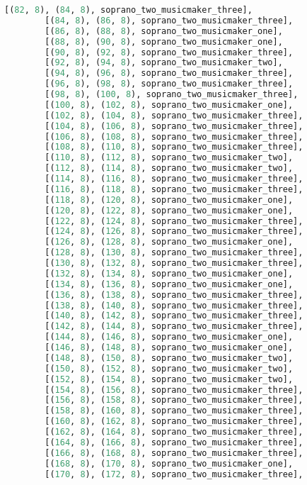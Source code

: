 \begin{lstlisting}[language=Python, caption=Invocation Source Code]
        [(82, 8), (84, 8), soprano_two_musicmaker_three],
        [(84, 8), (86, 8), soprano_two_musicmaker_three],
        [(86, 8), (88, 8), soprano_two_musicmaker_one],
        [(88, 8), (90, 8), soprano_two_musicmaker_one],
        [(90, 8), (92, 8), soprano_two_musicmaker_three],
        [(92, 8), (94, 8), soprano_two_musicmaker_two],
        [(94, 8), (96, 8), soprano_two_musicmaker_three],
        [(96, 8), (98, 8), soprano_two_musicmaker_three],
        [(98, 8), (100, 8), soprano_two_musicmaker_three],
        [(100, 8), (102, 8), soprano_two_musicmaker_one],
        [(102, 8), (104, 8), soprano_two_musicmaker_three],
        [(104, 8), (106, 8), soprano_two_musicmaker_three],
        [(106, 8), (108, 8), soprano_two_musicmaker_three],
        [(108, 8), (110, 8), soprano_two_musicmaker_three],
        [(110, 8), (112, 8), soprano_two_musicmaker_two],
        [(112, 8), (114, 8), soprano_two_musicmaker_two],
        [(114, 8), (116, 8), soprano_two_musicmaker_three],
        [(116, 8), (118, 8), soprano_two_musicmaker_three],
        [(118, 8), (120, 8), soprano_two_musicmaker_one],
        [(120, 8), (122, 8), soprano_two_musicmaker_one],
        [(122, 8), (124, 8), soprano_two_musicmaker_three],
        [(124, 8), (126, 8), soprano_two_musicmaker_three],
        [(126, 8), (128, 8), soprano_two_musicmaker_one],
        [(128, 8), (130, 8), soprano_two_musicmaker_three],
        [(130, 8), (132, 8), soprano_two_musicmaker_three],
        [(132, 8), (134, 8), soprano_two_musicmaker_one],
        [(134, 8), (136, 8), soprano_two_musicmaker_one],
        [(136, 8), (138, 8), soprano_two_musicmaker_three],
        [(138, 8), (140, 8), soprano_two_musicmaker_three],
        [(140, 8), (142, 8), soprano_two_musicmaker_three],
        [(142, 8), (144, 8), soprano_two_musicmaker_three],
        [(144, 8), (146, 8), soprano_two_musicmaker_one],
        [(146, 8), (148, 8), soprano_two_musicmaker_one],
        [(148, 8), (150, 8), soprano_two_musicmaker_two],
        [(150, 8), (152, 8), soprano_two_musicmaker_two],
        [(152, 8), (154, 8), soprano_two_musicmaker_two],
        [(154, 8), (156, 8), soprano_two_musicmaker_three],
        [(156, 8), (158, 8), soprano_two_musicmaker_three],
        [(158, 8), (160, 8), soprano_two_musicmaker_three],
        [(160, 8), (162, 8), soprano_two_musicmaker_three],
        [(162, 8), (164, 8), soprano_two_musicmaker_three],
        [(164, 8), (166, 8), soprano_two_musicmaker_three],
        [(166, 8), (168, 8), soprano_two_musicmaker_three],
        [(168, 8), (170, 8), soprano_two_musicmaker_one],
        [(170, 8), (172, 8), soprano_two_musicmaker_three],

\end{lstlisting}
